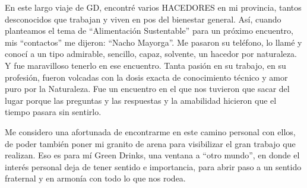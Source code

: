 En este largo viaje de GD, encontré varios HACEDORES en mi provincia,
tantos desconocidos que trabajan y viven en pos del bienestar general.
Así, cuando planteamos el tema de ``Alimentación Sustentable'' para un
próximo encuentro, mis ``contactos'' me dijeron: ``Nacho Mayorga''. Me
pasaron su teléfono, lo llamé y conocí a un tipo admirable, sencillo,
capaz, solvente, un hacedor por naturaleza. Y fue maravilloso tenerlo en
ese encuentro. Tanta pasión en su trabajo, en su profesión, fueron
volcadas con la dosis exacta de conocimiento técnico y amor puro por la
Naturaleza. Fue un encuentro en el que nos tuvieron que sacar del lugar
porque las preguntas y las respuestas y la amabilidad hicieron que el
tiempo pasara sin sentirlo.

Me considero una afortunada de encontrarme en este camino personal con
ellos, de poder también poner mi granito de arena para visibilizar el
gran trabajo que realizan. Eso es para mí Green Drinks, una ventana a
``otro mundo'', en donde el interés personal deja de tener sentido e
importancia, para abrir paso a un sentido fraternal y en armonía con
todo lo que nos rodea.